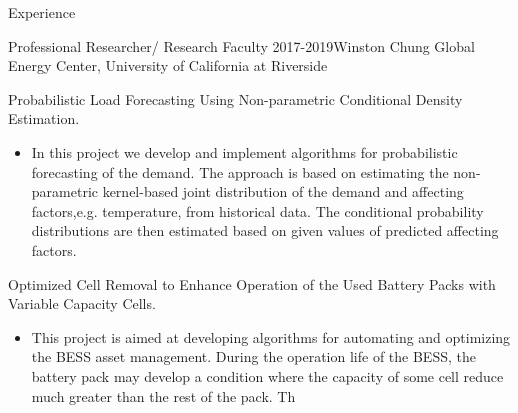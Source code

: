\documentclass{resume} %
\begin{document}
\begin{rSection}{ Experience}
\begin{rSubsection}{Professional Researcher/  Research Faculty}{ 2017-2019}{Winston Chung Global Energy Center, University of California at Riverside}{}
\item[]  Probabilistic Load Forecasting Using Non-parametric Conditional Density Estimation.
\begin{itemize}
  \item  []  In this project we develop and implement algorithms for probabilistic forecasting of the demand.
   The approach is based on estimating the non-parametric kernel-based joint distribution of the demand and affecting factors,e.g. temperature, from historical data.
  The conditional probability distributions are then estimated based on given values of predicted affecting factors.
\end{itemize}


%

\item  [] Optimized Cell Removal to Enhance Operation of the  Used Battery Packs with Variable Capacity Cells.
\begin{itemize}
   \item  []  This project is aimed at developing algorithms for automating and optimizing the BESS asset management. 
  During the operation life of the BESS, the battery pack may develop a condition where the capacity of some cell reduce much greater than the rest of the pack. 
  Th
\end{itemize}





\end{rSubsection}
\end{rSection}
\end{document}
